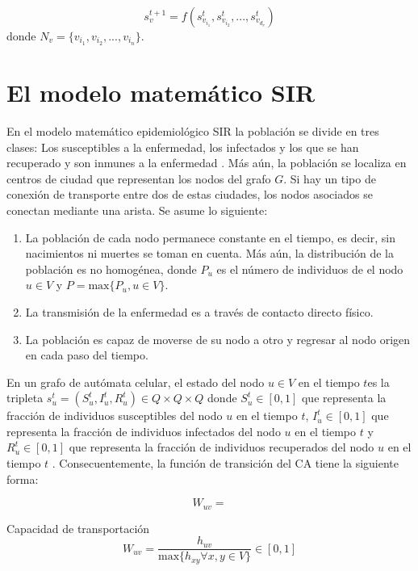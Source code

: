 \begin{equation}
	s_{v}^{t+1} = f(s_{v_{i_1} }^t, s_{v_{i_2} }^t,...,s_{v_{d_v} }^t)      
\end{equation}
donde $N_{v}= \{v_{i_1},v_{i_2},...,v_{i_n}\}$.

\section{El modelo matemático SIR}
En el modelo matemático epidemiológico SIR la población se divide en tres clases: Los susceptibles a la enfermedad, los infectados y los que se han recuperado y son inmunes a la enfermedad \cite{batista}. Más aún, la población se localiza en centros de ciudad que representan los nodos del grafo $G$. Si hay un tipo de conexión de transporte entre dos de estas ciudades, los nodos asociados se conectan mediante una arista. Se asume lo siguiente:

\begin{enumerate}
	\item La población de cada nodo permanece constante en el tiempo, es decir, sin nacimientos ni muertes se toman en cuenta. Más aún, la distribución de la población es no homogénea, donde $P_u$ es el número de  individuos de el nodo $u \in V$ y $P = \text{max}\{P_{u}, u \in V\}$.
	\item La transmisión de la enfermedad es a través de contacto directo físico.
	\item La población es capaz de moverse de su nodo a otro y regresar al nodo origen en cada paso del tiempo.
\end{enumerate}           

En un grafo de autómata celular, el estado del nodo $u \in V$  en el tiempo $t$es la tripleta $s_{u}^t = (S_{u}^t, I_{u}^t, R_{u}^t) \in Q \times Q \times Q  $ donde $S_{u}^t \in [0, 1]$ que representa la fracción de individuos susceptibles del nodo $u$ en el tiempo $t$, $I_{u}^t \in [0, 1]$ que representa la fracción de individuos infectados del nodo $u$ en el tiempo $t$  y $R_{u}^t \in [0, 1]$ que representa la fracción de individuos recuperados del nodo $u$ en el tiempo $t$ \cite{cagraph}.
Consecuentemente, la función de transición del CA tiene la siguiente forma:

\begin{equation}
W_{u v} = 
\end{equation}

Capacidad de transportación
\begin{equation}
	W_{u v} = \frac{ h_{u v} }  {\text{max} \{h_{xy} \forall x, y \in V \} } \in [0,1]
\end{equation}


